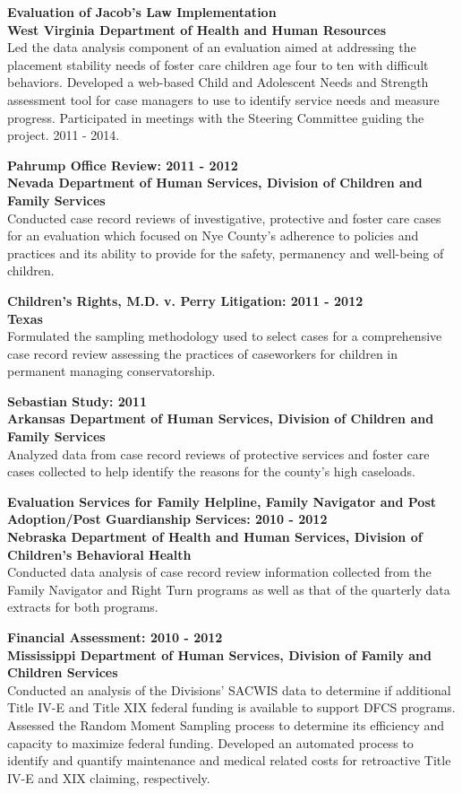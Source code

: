 \documentclass[line, mm, 10pt]{res}
\begin{document}
\begin{resume}
  {\bf Evaluation of Jacob's Law Implementation} \\
  {\bf West Virginia Department of Health and Human Resources} \\
  Led the data analysis component of an evaluation aimed at addressing
  the placement stability needs of foster care children age four to
  ten with difficult behaviors. Developed a web-based Child and
  Adolescent Needs and Strength assessment tool for case managers to
  use to identify service needs and measure progress. Participated in
  meetings with the Steering Committee guiding the project. 2011 -
  2014.

  {\bf Pahrump Office Review: 2011 - 2012}  \\
  {\bf Nevada Department of Human Services, Division of Children and
    Family Services} \\
  Conducted case record reviews of investigative, protective and
  foster care cases for an evaluation which focused on Nye County's
  adherence to policies and practices and its ability to provide for
  the safety, permanency and well-being of children.

  {\bf Children's Rights, M.D. v. Perry Litigation: 2011 - 2012} \\
  {\bf Texas} \\
  Formulated the sampling methodology used to select cases for a
  comprehensive case record review assessing the practices of
  caseworkers for children in permanent managing conservatorship.

  {\bf Sebastian Study: 2011}  \\
  {\bf Arkansas Department of Human Services, Division of Children and
    Family Services} \\
  Analyzed data from case record reviews of protective services and
  foster care cases collected to help identify the reasons for the
  county's high caseloads.

  {\bf Evaluation Services for Family Helpline, Family Navigator and
    Post Adoption/Post Guardianship Services: 2010 - 2012} \\
  {\bf Nebraska Department of Health and Human Services, Division of
    Children's Behavioral Health} \\
  Conducted data analysis of case record review information collected
  from the Family Navigator and Right Turn programs as well as that of
  the quarterly data extracts for both programs.

  {\bf Financial Assessment: 2010 - 2012} \\
  {\bf Mississippi Department of Human Services, Division of Family
    and Children Services} \\
  Conducted an analysis of the Divisions' SACWIS data to determine if
  additional Title IV-E and Title XIX federal funding is available to
  support DFCS programs.  Assessed the Random Moment Sampling process
  to determine its efficiency and capacity to maximize federal
  funding. Developed an automated process to identify and quantify
  maintenance and medical related costs for retroactive Title IV-E and
  XIX claiming, respectively.


\end{resume}
\end{document}
